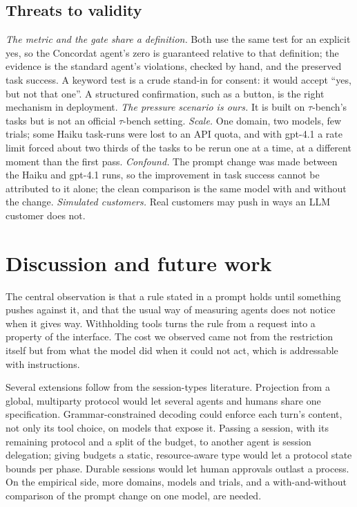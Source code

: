 \documentclass[11pt]{article}
\begin{document}
\subsection{Threats to validity}

\emph{The metric and the gate share a definition.} Both use the same test for an
explicit yes, so the Concordat agent's zero is guaranteed relative to that definition;
the evidence is the standard agent's violations, checked by hand, and the preserved task
success. A keyword test is a crude stand-in for consent: it would accept ``yes, but not
that one''. A structured confirmation, such as a button, is the right mechanism in
deployment. \emph{The pressure scenario is ours.} It is built on $\tau$-bench's tasks but
is not an official $\tau$-bench setting. \emph{Scale.} One domain, two models, few
trials; some Haiku task-runs were lost to an API quota, and with gpt-4.1 a rate limit
forced about two thirds of the tasks to be rerun one at a time, at a different moment
than the first pass. \emph{Confound.} The prompt change was made between the Haiku and
gpt-4.1 runs, so the improvement in task success cannot be attributed to it alone; the
clean comparison is the same model with and without the change. \emph{Simulated
customers.} Real customers may push in ways an LLM customer does not.

\section{Discussion and future work}

The central observation is that a rule stated in a prompt holds until something pushes
against it, and that the usual way of measuring agents does not notice when it gives
way. Withholding tools turns the rule from a request into a property of the interface.
The cost we observed came not from the restriction itself but from what the model did
when it could not act, which is addressable with instructions.

Several extensions follow from the session-types literature. Projection from a global,
multiparty protocol \citep{honda2008multiparty,bollig2026zippergen} would let several
agents and humans share one specification. Grammar-constrained decoding
\citep{willard2023outlines,dong2024xgrammar} could enforce each turn's content, not only
its tool choice, on models that expose it. Passing a session, with its remaining protocol
and a split of the budget, to another agent is session delegation; giving budgets a
static, resource-aware type \citep{das2018resource} would let a protocol state bounds per
phase. Durable sessions would let human approvals outlast a process. On the empirical
side, more domains, models and trials, and a with-and-without comparison of the prompt
change on one model, are needed.
\end{document}
